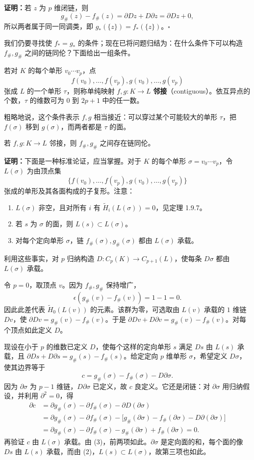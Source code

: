 \noindent\textbf{证明：}若 $z$ 为 $p$ 维闭链，则
\[
g_\#(z)-f_\#(z)=\partial Dz+D\partial z=\partial Dz+0,
\]
所以两者属于同一同调类，即 $g_*(\{z\})=f_*(\{z\})$。\hfill$\square$

我们仍要寻找使 $f_*=g_*$ 的条件；现在已将问题归结为：在什么条件下可以构造 $f_\#,g_\#$ 之间的链同伦？下面给出一组条件。

若对 $K$ 的每个单形 $v_0\cdots v_p$，点
\[
f(v_0),\ldots,f(v_p),g(v_0),\ldots,g(v_p)
\]
张成 $L$ 的一个单形 $\tau$，则称单纯映射 $f,g:K\to L$ \textbf{邻接}（contiguous）。依互异点的个数，$\tau$ 的维数可为 $0$ 到 $2p+1$ 中的任一数。

粗略地说，这个条件表示 $f,g$ 相当接近：可以穿过某个可能较大的单形 $\tau$，把 $f(\sigma)$ 移到 $g(\sigma)$，而两者都是 $\tau$ 的面。

若 $f,g:K\to L$ 邻接，则 $f_\#,g_\#$ 之间存在链同伦。

\noindent\textbf{证明：}下面是一种标准论证，应当掌握。对于 $K$ 的每个单形 $\sigma=v_0\cdots v_p$，令 $L(\sigma)$ 为由顶点集
\[
\{f(v_0),\ldots,f(v_p),g(v_0),\ldots,g(v_p)\}
\]
张成的单形及其各面构成的子复形。注意：
\begin{enumerate}[label=(\arabic*)]
\item $L(\sigma)$ 非空，且对所有 $i$ 有 $\widetilde H_i(L(\sigma))=0$，见定理 1.9.7。
\item 若 $s$ 为 $\sigma$ 的面，则 $L(s)\subset L(\sigma)$。
\item 对每个定向单形 $\sigma$，链 $f_\#(\sigma),g_\#(\sigma)$ 都由 $L(\sigma)$ 承载。
\end{enumerate}
利用这些事实，对 $p$ 归纳构造 $D:C_p(K)\to C_{p+1}(L)$，使每条 $D\sigma$ 都由 $L(\sigma)$ 承载。

令 $p=0$，取顶点 $v$。因为 $f_\#,g_\#$ 保持增广，
\[
\epsilon(g_\#(v)-f_\#(v))=1-1=0.
\]
因此此差代表 $\widetilde H_0(L(v))$ 的元素。该群为零，可选取由 $L(v)$ 承载的 $1$ 维链 $Dv$，使 $\partial Dv=g_\#(v)-f_\#(v)$。于是 $\partial Dv+D\partial v=g_\#(v)-f_\#(v)$。对每个顶点如此定义 $D$。

现设在小于 $p$ 的维数已定义 $D$，使每个这样的定向单形 $s$ 满足 $Ds$ 由 $L(s)$ 承载，且 $\partial Ds+D\partial s=g_\#(s)-f_\#(s)$。给定定向 $p$ 维单形 $\sigma$，希望定义 $D\sigma$，使其边界等于
\[
c=g_\#(\sigma)-f_\#(\sigma)-D\partial\sigma.
\]
因为 $\partial\sigma$ 为 $p-1$ 维链，$D\partial\sigma$ 已定义，故 $c$ 良定义。它还是闭链：对 $\partial\sigma$ 用归纳假设，并利用 $\partial^2=0$，得
\[
\begin{aligned}
\partial c&=\partial g_\#(\sigma)-\partial f_\#(\sigma)-\partial D(\partial\sigma)\\
&=\partial g_\#(\sigma)-\partial f_\#(\sigma)
-\bigl[g_\#(\partial\sigma)-f_\#(\partial\sigma)-D\partial(\partial\sigma)\bigr]\\
&=\partial g_\#(\sigma)-\partial f_\#(\sigma)-g_\#(\partial\sigma)+f_\#(\partial\sigma)=0.
\end{aligned}
\]
再验证 $c$ 由 $L(\sigma)$ 承载。由 (3)，前两项如此。$\partial\sigma$ 是定向面的和，每个面的像 $Ds$ 由 $L(s)$ 承载，而由 (2)，$L(s)\subset L(\sigma)$，故第三项也如此。

